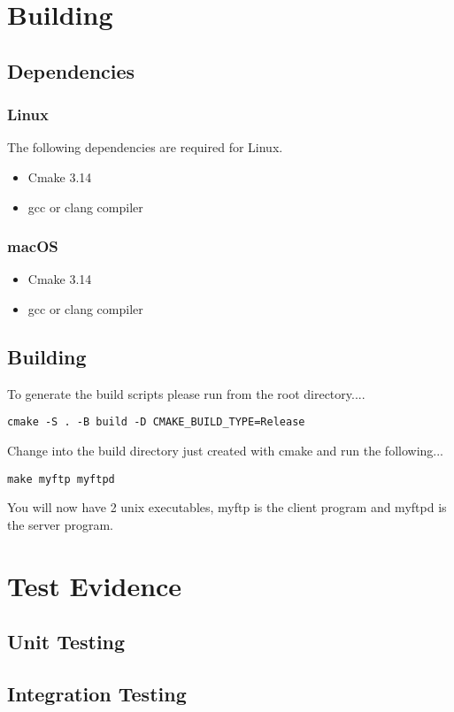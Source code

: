 \documentclass{article}
\begin{document}
\section{Building}
\subsection{Dependencies}
\subsubsection*{Linux}
The following dependencies are required for Linux.
\begin{itemize}
    \item Cmake 3.14
    \item gcc or clang compiler
\end{itemize}
\subsubsection*{macOS}
\begin{itemize}
    \item Cmake 3.14
    \item gcc or clang compiler
\end{itemize}
\subsection{Building}
To generate the build scripts please run from the root directory....
\begin{lstlisting}
cmake -S . -B build -D CMAKE_BUILD_TYPE=Release    
\end{lstlisting}
Change into the build directory just created with cmake and run the following...
\begin{lstlisting}
make myftp myftpd    
\end{lstlisting}
You will now have 2 unix executables, myftp is the client program and myftpd is the server program.

\section{Test Evidence}
\subsection{Unit Testing}

\subsection{Integration Testing}
\end{document}
